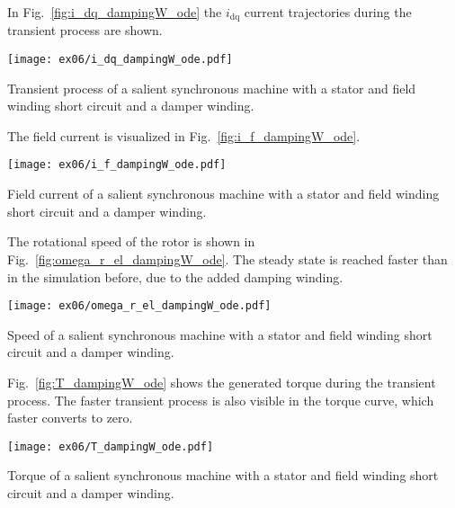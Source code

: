 \begin{solutionblock}
    In Fig.~\ref{fig:i_dq_dampingW_ode} the $i_{\mathrm{dq}}$ current trajectories during the transient process are shown.
    \begin{solutionfigure}
        \centering
        \texttt{[image: ex06/i\_dq\_dampingW\_ode.pdf]}
        \caption{Transient process of a salient synchronous machine with a stator and field winding short circuit and a damper winding.}
        \label{fig:i_dq_dampingW_ode}
    \end{solutionfigure}

    The field current is visualized in Fig.~\ref{fig:i_f_dampingW_ode}.
    \begin{solutionfigure}
        \centering
        \texttt{[image: ex06/i\_f\_dampingW\_ode.pdf]}
        \caption{Field current of a salient synchronous machine with a stator and field winding short circuit and a damper winding.}
        \label{fig:i_f_dampingW_ode}
    \end{solutionfigure}

    The rotational speed of the rotor is shown in Fig.~\ref{fig:omega_r_el_dampingW_ode}. The steady state is reached faster than in the simulation before, due to the added damping winding.
    \begin{solutionfigure}
        \centering
        \texttt{[image: ex06/omega\_r\_el\_dampingW\_ode.pdf]}
        \caption{Speed of a salient synchronous machine with a stator and field winding short circuit and a damper winding.}
        \label{fig:omega_r_el_dampingW_ode}
    \end{solutionfigure}

    Fig.~\ref{fig:T_dampingW_ode} shows the generated torque during the transient process. The faster transient process is also visible in the torque curve, which faster converts to zero.
    \begin{solutionfigure}
        \centering
        \texttt{[image: ex06/T\_dampingW\_ode.pdf]}
        \caption{Torque of a salient synchronous machine with a stator and field winding short circuit and a damper winding.}
        \label{fig:T_dampingW_ode}
    \end{solutionfigure}

\end{solutionblock}

\FloatBarrier


